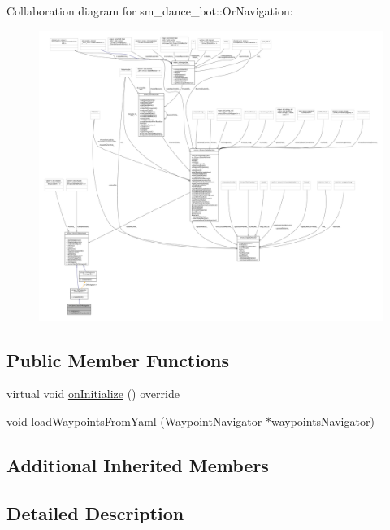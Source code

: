 Collaboration diagram for sm\+\_\+dance\+\_\+bot\+:\+:Or\+Navigation\+:
\nopagebreak
\begin{figure}[H]
\begin{center}
\leavevmode
\includegraphics[width=350pt]{classsm__dance__bot_1_1OrNavigation__coll__graph}
\end{center}
\end{figure}
\subsection*{Public Member Functions}
\begin{DoxyCompactItemize}
\item 
virtual void \hyperlink{classsm__dance__bot_1_1OrNavigation_a9f87c78f5af67024c9eda25097a135ac}{on\+Initialize} () override
\item 
void \hyperlink{classsm__dance__bot_1_1OrNavigation_a1f092ffe3a1b29ae9ea6623aff00ab16}{load\+Waypoints\+From\+Yaml} (\hyperlink{classcl__move__base__z_1_1WaypointNavigator}{Waypoint\+Navigator} $\ast$waypoints\+Navigator)
\end{DoxyCompactItemize}
\subsection*{Additional Inherited Members}


\subsection{Detailed Description}


